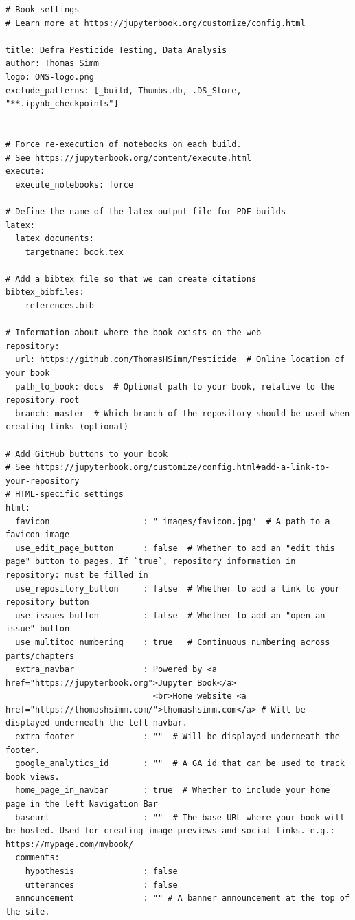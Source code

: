 \documentclass[
  letterpaper,
  DIV=11,
  numbers=noendperiod]{scrartcl}
\begin{document}
\begin{verbatim}
# Book settings
# Learn more at https://jupyterbook.org/customize/config.html

title: Defra Pesticide Testing, Data Analysis
author: Thomas Simm
logo: ONS-logo.png
exclude_patterns: [_build, Thumbs.db, .DS_Store, "**.ipynb_checkpoints"]


# Force re-execution of notebooks on each build.
# See https://jupyterbook.org/content/execute.html
execute:
  execute_notebooks: force

# Define the name of the latex output file for PDF builds
latex:
  latex_documents:
    targetname: book.tex

# Add a bibtex file so that we can create citations
bibtex_bibfiles:
  - references.bib

# Information about where the book exists on the web
repository:
  url: https://github.com/ThomasHSimm/Pesticide  # Online location of your book
  path_to_book: docs  # Optional path to your book, relative to the repository root
  branch: master  # Which branch of the repository should be used when creating links (optional)

# Add GitHub buttons to your book
# See https://jupyterbook.org/customize/config.html#add-a-link-to-your-repository
# HTML-specific settings
html:
  favicon                   : "_images/favicon.jpg"  # A path to a favicon image
  use_edit_page_button      : false  # Whether to add an "edit this page" button to pages. If `true`, repository information in repository: must be filled in
  use_repository_button     : false  # Whether to add a link to your repository button
  use_issues_button         : false  # Whether to add an "open an issue" button
  use_multitoc_numbering    : true   # Continuous numbering across parts/chapters
  extra_navbar              : Powered by <a href="https://jupyterbook.org">Jupyter Book</a>
                              <br>Home website <a href="https://thomashsimm.com/">thomashsimm.com</a> # Will be displayed underneath the left navbar.
  extra_footer              : ""  # Will be displayed underneath the footer.
  google_analytics_id       : ""  # A GA id that can be used to track book views.
  home_page_in_navbar       : true  # Whether to include your home page in the left Navigation Bar
  baseurl                   : ""  # The base URL where your book will be hosted. Used for creating image previews and social links. e.g.: https://mypage.com/mybook/
  comments:
    hypothesis              : false
    utterances              : false
  announcement              : "" # A banner announcement at the top of the site.
\end{verbatim}
\end{document}
